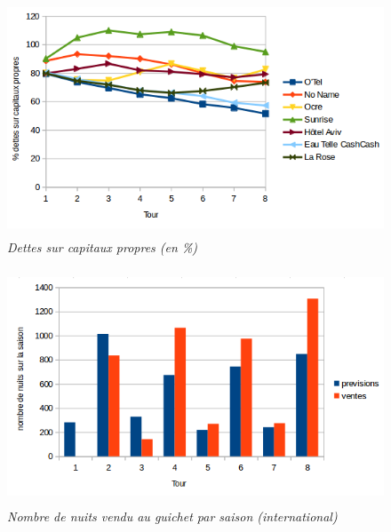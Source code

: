 \documentclass[a4paper,10pt]{article}
\begin{document}
    \begin{figure}[!ht]
      \begin{center}
	\includegraphics[height=7.0cm,keepaspectratio]{./images/dettes_capitaux.png}
      \end{center}
      \caption{\textit{Dettes sur capitaux propres (en \%)}}
    \end{figure}
    
    \begin{figure}[!ht]
      \begin{center}
	\includegraphics[height=7.0cm,keepaspectratio]{./images/ventes_internationales.png}
      \end{center}
      \caption{\textit{Nombre de nuits vendu au guichet par saison (international)}}
      \label{ventes_internationales}
    \end{figure}
    
\end{document}
